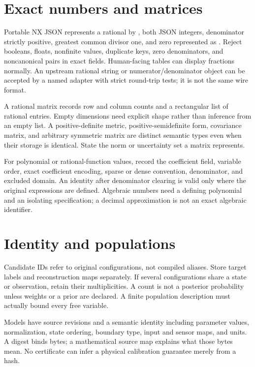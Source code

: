 \documentclass[
  11pt,
  a4paper,
]{report}
\let\nxtexttt\texttt
\renewcommand{\texttt}[1]{\nxtexttt{\seqsplit{#1}}}
\begin{document}
\hypertarget{exact-numbers-and-matrices}{%
\section{Exact numbers and matrices}\label{exact-numbers-and-matrices}}

Portable NX JSON represents a rational by
\texttt{{[}numerator,\ denominator{]}}, both JSON integers, denominator
strictly positive, greatest common divisor one, and zero represented as
\texttt{{[}0,1{]}}. Reject booleans, floats, nonfinite values, duplicate
keys, zero denominators, and noncanonical pairs in exact fields.
Human-facing tables can display fractions normally. An upstream rational
string or numerator/denominator object can be accepted by a named
adapter with strict round-trip tests; it is not the same wire format.

A rational matrix records row and column counts and a rectangular list
of rational entries. Empty dimensions need explicit shape rather than
inference from an empty list. A positive-definite metric,
positive-semidefinite form, covariance matrix, and arbitrary symmetric
matrix are distinct semantic types even when their storage is identical.
State the norm or uncertainty set a matrix represents.

For polynomial or rational-function values, record the coefficient
field, variable order, exact coefficient encoding, sparse or dense
convention, denominator, and excluded domain. An identity after
denominator clearing is valid only where the original expressions are
defined. Algebraic numbers need a defining polynomial and an isolating
specification; a decimal approximation is not an exact algebraic
identifier.

\hypertarget{identity-and-populations}{%
\section{Identity and populations}\label{identity-and-populations}}

Candidate IDs refer to original configurations, not compiled aliases.
Store target labels and reconstruction maps separately. If several
configurations share a state or observation, retain their
multiplicities. A count is not a posterior probability unless weights or
a prior are declared. A finite population description must actually
bound every free variable.

Models have source revisions and a semantic identity including parameter
values, normalization, state ordering, boundary type, input and sensor
maps, and units. A digest binds bytes; a mathematical source map
explains what those bytes mean. No certificate can infer a physical
calibration guarantee merely from a hash.
\end{document}
